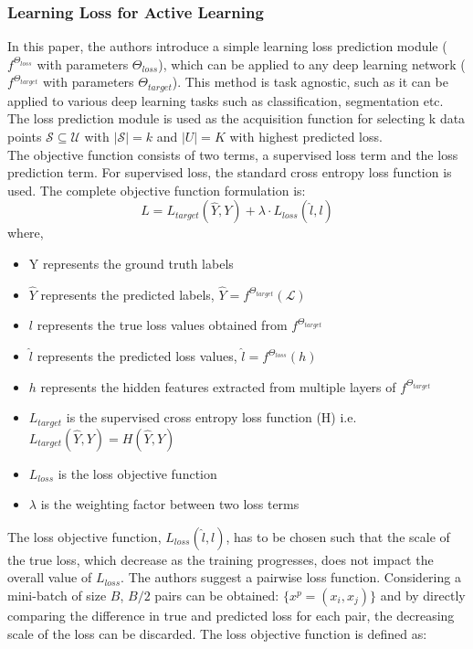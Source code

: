 \subsubsection{Learning Loss for Active Learning\cite{yoo2019}}
In this paper, the authors introduce a simple learning loss prediction module ($f^{\Theta_{loss}}$ with parameters $\Theta_{loss}$), which can be applied to any deep learning network ($f^{\Theta_{target}}$ with parameters $\Theta_{target}$). This method is task agnostic, such as it can be applied to various deep learning tasks such as classification, segmentation etc. The loss prediction module is used as the acquisition function for selecting k data points $\mathcal{S} \subseteq \mathcal{U}$ with $|\mathcal{S}| = k$ and $|U| = K$ with highest predicted loss. \\
The objective function consists of two terms, a supervised loss term and the loss prediction term. For supervised loss, the standard cross entropy loss function\cite{cox1958} is used. The complete objective function formulation is:
\begin{equation}
    \label{equation:learning_loss_full_loss}
    L = L_{target}(\hat{Y}, Y) + \lambda \cdot L_{loss}(\hat{l}, l)
\end{equation}
where,
\begin{itemize}[label={}]
  \setlength\itemsep{0em}
  \item Y represents the ground truth labels
  \item $\hat{Y}$ represents the predicted labels, $\hat{Y} = f^{\Theta_{target}}(\mathcal{L})$
  \item $l$ represents the true loss values obtained from $f^{\Theta_{target}}$
  \item $\hat{l}$ represents the predicted loss values, $\hat{l} = f^{\Theta_{loss}}(h)$
  \item $h$ represents the hidden features extracted from multiple layers of $f^{\Theta_{target}}$
  \item $L_{target}$ is the supervised cross entropy loss function (H) i.e. $L_{target}(\hat{Y}, Y) = H(\hat{Y}, Y)$
  \item $L_{loss}$ is the loss objective function
  \item $\lambda$ is the weighting factor between two loss terms
\end{itemize}
The loss objective function, $L_{loss}(\hat{l}, l)$, has to be chosen such that the scale of the true loss, which decrease as the training progresses, does not impact the overall value of $L_{loss}$. The authors suggest a pairwise loss function. Considering a mini-batch of size $B$, $B/2$ pairs can be obtained: $\{x^p = (x_i, x_j)\}$ and by directly comparing the difference in true and predicted loss for each pair, the decreasing scale of the loss can be discarded. The loss objective function is defined as:
